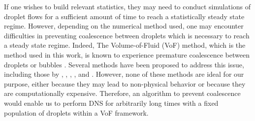 
If one wishes to build relevant statistics, they may need to conduct simulations of droplet flows for a sufficient amount of time to reach a statistically steady state regime. 
However, depending on the numerical method used, one may encounter difficulties in preventing coalescence between droplets which is necessary to reach a steady state regime. 
Indeed, The Volume-of-Fluid (VoF) method, which is the method used in this work, is known to experience premature coalescence between droplets or bubbles \citep{innocenti2020direct}.
Several methods have been proposed to address this issue, including those by \citet{roghair2011drag}, \citet{hidman2023assessing}, \citet{balcazar2015multiple}, \citet{zhang2023evolution}, and \citet{karnakov2022computing}. 
However, none of these methods are ideal for our purpose, either because they may lead to non-physical behavior or because they are computationally expensive. Therefore, an algorithm to prevent coalescence would enable us to perform DNS for arbitrarily long times with a fixed population of droplets within a VoF framework.


